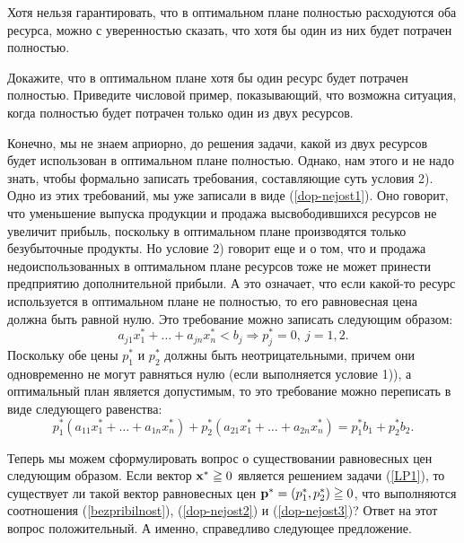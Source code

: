     Хотя нельзя гарантировать, что в оптимальном плане полностью
    расходуются оба ресурса, можно с уверенностью сказать, что хотя
    бы один из них будет потрачен полностью.

\begin{exer}
    Докажите, что в оптимальном плане хотя бы один ресурс будет
    потрачен полностью. Приведите числовой пример, показывающий, что возможна
    ситуация, когда полностью будет потрачен только один из двух
    ресурсов.
\end{exer}

    Конечно, мы не знаем априорно, до решения задачи,
     какой из двух ресурсов будет использован в оптимальном плане полностью.
    Однако, нам этого и не надо знать, чтобы формально записать
    требования, составляющие суть условия 2). Одно из этих
    требований, мы уже записали в виде (\ref{dop-nejost1}). Оно
    говорит, что уменьшение выпуска продукции и продажа
    высвободившихся ресурсов не увеличит прибыль, поскольку в
    оптимальном плане производятся только безубыточные продукты. Но
    условие 2) говорит еще и о том, что и продажа недоиспользованных
    в оптимальном плане ресурсов тоже не может принести предприятию
    дополнительной прибыли. А это означает, что если какой-то ресурс
    используется в оптимальном плане не полностью, то его
    равновесная цена должна быть равной нулю. Это требование можно
    записать следующим образом:
    \[a_{j1}x_{1}^{*}+\ldots+a_{jn}x_{n}^{*}<b_{j}\Rightarrow p_{j}^{*}=0, \ j=1,2.\]
    Поскольку обе цены $p_{1}^{*}$ и $p_{2}^{*}$ должны быть
    неотрицательными, причем они одновременно не могут равняться
    нулю (если выполняется условие 1)), а оптимальный план является
    допустимым, то это требование можно переписать в виде следующего равенства:
\begin{equation}\label{dop-nejost3}
    p_{1}^{*}(a_{11}x_{1}^{*}+\ldots+a_{1n}x_{n}^{*})
      +p_{2}^{*}(a_{21}x_{1}^{*}+\ldots+a_{2n}x_{n}^{*})
    =p_{1}^{*}b_{1}+p_{2}^{*}b_{2}.
\end{equation}

    Теперь мы можем сформулировать вопрос о существовании
    равновесных цен следующим образом. Если  вектор $\mathbf{x^{*}}\geqq0$
    является решением задачи (\ref{LP1}), то существует ли такой вектор
    равновесных цен $\mathbf{p^{*}}=(p_{1}^{*},p_{2}^{*})\geqq0$, что
    выполняются соотношения (\ref{bezpribilnost}),
    (\ref{dop-nejost2}) и (\ref{dop-nejost3})?
    Ответ на этот вопрос положительный. А именно, справедливо
    следующее предложение.


